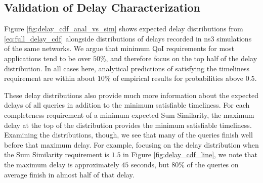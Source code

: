 \subsection{Validation of Delay Characterization}

Figure \ref{fig:delay_cdf_anal_vs_sim} shows expected delay distributions from \ref{eq:full_delay_cdf} alongside distributions of delays recorded in ns3 simulations of the same networks.  We argue that minimum QoI requirements for most applications tend to be over $50\%$, and therefore focus on the top half of the delay distribution.  In all cases here, analytical predictions of satisfying the timeliness requirement are within about $10\%$ of empirical results for probabilities above $0.5$.  

These delay distributions also provide much more information about the expected delays of all queries in addition to the minimum satisfiable timeliness.  For each completeness requirement of a minimum expected Sum Similarity, the maximum delay at the top of the distribution provides the minimum satisfiable timeliness.  Examining the distributions, though, we see that many of the queries finish well before that maximum delay.  For example, focusing on the delay distribution when the Sum Similarity requirement is $1.5$ in Figure \ref{fig:delay_cdf_line}, we note that the maximum delay is approximately $45$ seconds, but $80\%$ of the queries on average finish in almost half of that delay.  

%

%
%

